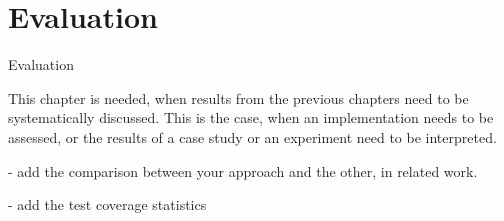 \chapter{Evaluation}
\label{Evaluation}

Evaluation

This chapter is needed, when results from the previous chapters need to be systematically discussed. This is the case, when an implementation needs to be assessed, or the results of a case study or an experiment need to be interpreted.


- add the comparison between your approach and the other, in related work.

- add the test coverage statistics


